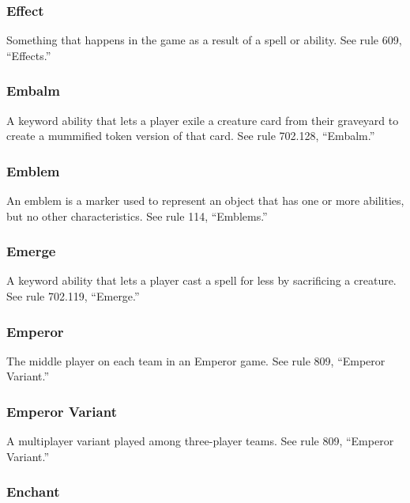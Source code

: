 {{{{{{{\subsubsection*{Effect}

Something that happens in the game as a result of a spell or ability. See rule 609, “Effects.”

\subsubsection*{Embalm}

A keyword ability that lets a player exile a creature card from their graveyard to create a mummified token version of that card. See rule 702.128, “Embalm.”

\subsubsection*{Emblem}

An emblem is a marker used to represent an object that has one or more abilities, but no other characteristics. See rule 114, “Emblems.”

\subsubsection*{Emerge}

A keyword ability that lets a player cast a spell for less by sacrificing a creature. See rule 702.119, “Emerge.”

\subsubsection*{Emperor}

The middle player on each team in an Emperor game. See rule 809, “Emperor Variant.”

\subsubsection*{Emperor Variant}

A multiplayer variant played among three-player teams. See rule 809, “Emperor Variant.”

\subsubsection*{Enchant}

}}}}}}}
